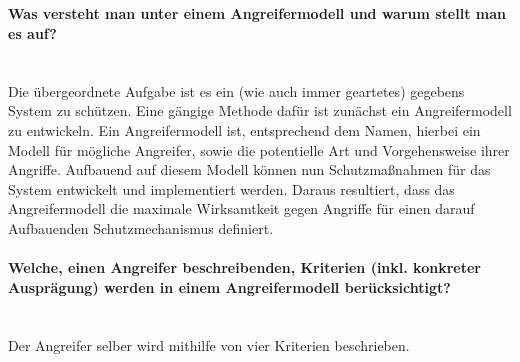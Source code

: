 \documentclass[ngerman]{fbi-aufgabenblatt}
\begin{document}
\setcounter{section}{2}


\subsection{}

\paragraph*{Was versteht man unter einem Angreifermodell und warum stellt man es auf?} ~\\

Die übergeordnete Aufgabe ist es ein (wie auch immer geartetes) gegebens System zu schützen. Eine gängige Methode dafür ist zunächst ein Angreifermodell zu entwickeln. Ein Angreifermodell ist, entsprechend dem Namen, hierbei ein Modell für mögliche Angreifer, sowie die potentielle Art und Vorgehensweise ihrer Angriffe. Aufbauend auf diesem Modell können nun Schutzmaßnahmen für das System entwickelt und implementiert werden. Daraus resultiert, dass das Angreifermodell die maximale Wirksamtkeit gegen Angriffe für einen darauf Aufbauenden Schutzmechanismus definiert.

\paragraph*{Welche, einen Angreifer beschreibenden, Kriterien (inkl. konkreter Ausprägung) werden in einem Angreifermodell berücksichtigt?} ~\\

Der Angreifer selber wird mithilfe von vier Kriterien beschrieben.
\end{document}
